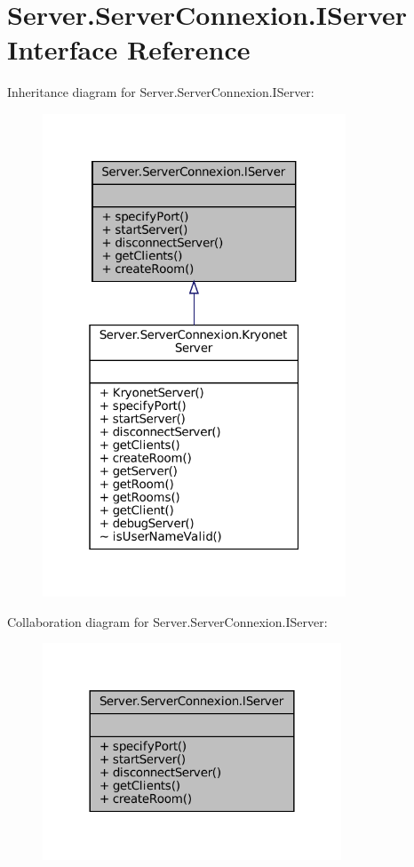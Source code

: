\hypertarget{interfaceServer_1_1ServerConnexion_1_1IServer}{}\section{Server.\+Server\+Connexion.\+I\+Server Interface Reference}
\label{interfaceServer_1_1ServerConnexion_1_1IServer}


Inheritance diagram for Server.\+Server\+Connexion.\+I\+Server\+:
\nopagebreak
\begin{figure}[H]
\begin{center}
\leavevmode
\includegraphics[width=256pt]{interfaceServer_1_1ServerConnexion_1_1IServer__inherit__graph}
\end{center}
\end{figure}


Collaboration diagram for Server.\+Server\+Connexion.\+I\+Server\+:
\nopagebreak
\begin{figure}[H]
\begin{center}
\leavevmode
\includegraphics[width=252pt]{interfaceServer_1_1ServerConnexion_1_1IServer__coll__graph}
\end{center}
\end{figure}
